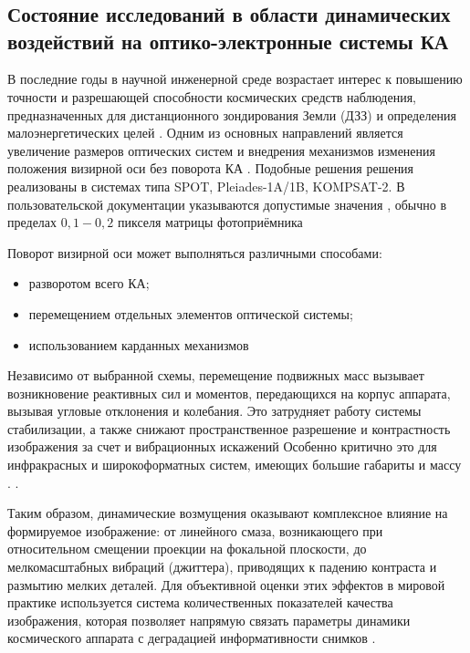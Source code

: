 \chapter{}\label{ch:ch1}
\section{Состояние исследований в области динамических воздействий на оптико-электронные системы КА}

В последние годы в научной инженерной среде возрастает интерес к повышению точности и разрешающей способности космических средств наблюдения, предназначенных для дистанционного зондирования Земли (ДЗЗ) и определения малоэнергетических целей \cite{haroon2020multisized, bouwmeester2023enabling, saunders2017building, cheng2024geometric, hamm2015earth}. Одним из основных направлений является увеличение размеров оптических систем и внедрения механизмов изменения положения визирной оси без поворота КА \cite{kandepi2024agile, franze2023attitude}. Подобные решения решения реализованы в системах типа SPOT, Pleiades-1A/1B, KOMPSAT-2. В пользовательской документации указываются допустимые значения \blur{}, обычно в пределах $0,1-0,2$ пикселя матрицы фотоприёмника \cite{SPOT2013, Pleiades2012,KOMPSAT2008} 

Поворот визирной оси может выполняться различными способами:
\begin{itemize}
	\item разворотом всего КА;
	\item перемещением отдельных элементов оптической системы;
	\item использованием карданных механизмов \cite{leskov2010kardan,negro2023inertial}
\end{itemize}

Независимо от выбранной схемы, перемещение подвижных масс вызывает возникновение реактивных сил и моментов, передающихся на корпус аппарата, вызывая угловые отклонения и колебания. Это затрудняет работу системы стабилизации, а также снижают пространственное разрешение и контрастность изображения за счет \blur{} и вибрационных искажений  \cite{lappas2002attitude, углова2019оценка, zhao2023effect} Особенно критично это для инфракрасных и широкоформатных систем, имеющих большие габариты и массу \cite{shorthill1990infrared. shivanandan1985far}.   \cite{pittelkau2012pointing, dennehy2021spacecraft, alvarez2018spacecraft}.

Таким образом, динамические возмущения оказывают комплексное влияние на формируемое изображение: от линейного смаза, возникающего при относительном смещении проекции на фокальной плоскости, до мелкомасштабных вибраций (джиттера), приводящих к падению контраста и размытию мелких деталей. Для объективной оценки этих эффектов в мировой практике используется система количественных показателей качества изображения, которая позволяет напрямую связать параметры динамики космического аппарата с деградацией информативности снимков \cite{gecha2021review, wahballah2018smear}.


